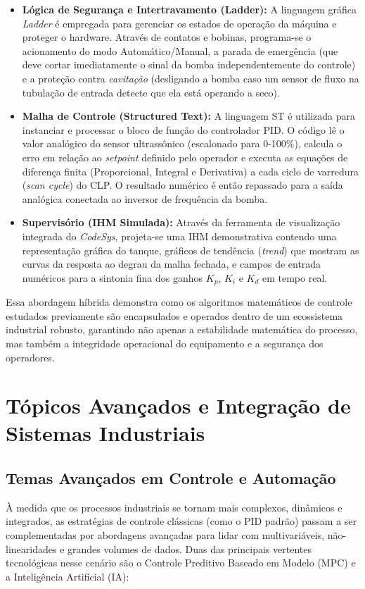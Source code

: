 \documentclass[12pt]{article}
\begin{document}
\begin{itemize}
    \item \textbf{Lógica de Segurança e Intertravamento (Ladder):} A linguagem gráfica \textit{Ladder} é empregada para gerenciar os estados de operação da máquina e proteger o hardware. Através de contatos e bobinas, programa-se o acionamento do modo Automático/Manual, a parada de emergência (que deve cortar imediatamente o sinal da bomba independentemente do controle) e a proteção contra \textit{cavitação} (desligando a bomba caso um sensor de fluxo na tubulação de entrada detecte que ela está operando a seco).
    \item \textbf{Malha de Controle (Structured Text):} A linguagem ST é utilizada para instanciar e processar o bloco de função do controlador PID. O código lê o valor analógico do sensor ultrassônico (escalonado para 0-100\%), calcula o erro em relação ao \textit{setpoint} definido pelo operador e executa as equações de diferença finita (Proporcional, Integral e Derivativa) a cada ciclo de varredura (\textit{scan cycle}) do CLP. O resultado numérico é então repassado para a saída analógica conectada ao inversor de frequência da bomba.
    \item \textbf{Supervisório (IHM Simulada):} Através da ferramenta de visualização integrada do \textit{CodeSys}, projeta-se uma IHM demonstrativa contendo uma representação gráfica do tanque, gráficos de tendência (\textit{trend}) que mostram as curvas da resposta ao degrau da malha fechada, e campos de entrada numéricos para a sintonia fina dos ganhos $K_p$, $K_i$ e $K_d$ em tempo real.
\end{itemize}

Essa abordagem híbrida demonstra como os algoritmos matemáticos de controle estudados previamente são encapsulados e operados dentro de um ecossistema industrial robusto, garantindo não apenas a estabilidade matemática do processo, mas também a integridade operacional do equipamento e a segurança dos operadores.

\section{Tópicos Avançados e Integração de Sistemas Industriais}

\subsection{Temas Avançados em Controle e Automação}
À medida que os processos industriais se tornam mais complexos, dinâmicos e integrados, as estratégias de controle clássicas (como o PID padrão) passam a ser complementadas por abordagens avançadas para lidar com multivariáveis, não-linearidades e grandes volumes de dados. Duas das principais vertentes tecnológicas nesse cenário são o Controle Preditivo Baseado em Modelo (MPC) e a Inteligência Artificial (IA):
\end{document}
